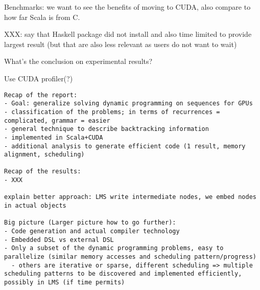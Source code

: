 {\color{red} Benchmarks: we want to see the benefits of moving to CUDA, also compare to how far Scala is from C.}

{\color{red} XXX: say that Haskell package did not install and also time limited to provide largest result (but that are also less relevant as users do not want to wait)}

{\color{red} What's the conclusion on experimental results?}


{\color{red} Use CUDA profiler(?)}


\begin{verbatim}
Recap of the report:
- Goal: generalize solving dynamic programming on sequences for GPUs
- classification of the problems; in terms of recurrences = complicated, grammar = easier
- general technique to describe backtracking information
- implemented in Scala+CUDA
- additional analysis to generate efficient code (1 result, memory alignment, scheduling)

Recap of the results:
- XXX

explain better approach: LMS write intermediate nodes, we embed nodes in actual objects

Big picture (Larger picture how to go further):
- Code generation and actual compiler technology
- Embedded DSL vs external DSL
- Only a subset of the dynamic programming problems, easy to parallelize (similar memory accesses and scheduling pattern/progress)
  - others are iterative or sparse, different scheduling => multiple scheduling patterns to be discovered and implemented efficiently, possibly in LMS (if time permits)
\end{verbatim}
